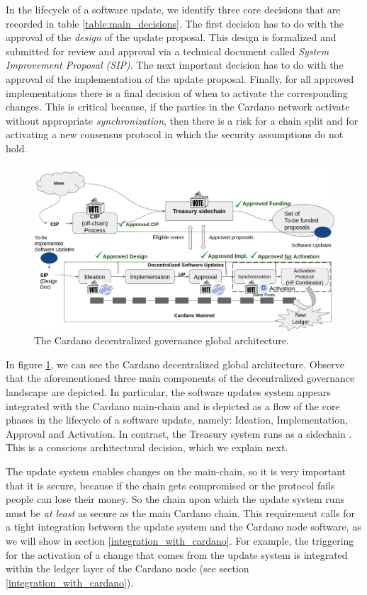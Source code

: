 In the lifecycle of a software update, we identify three core decisions that 
are 
recorded in table \ref{table:main_decisions}. The first decision has to do with 
the approval of the \emph{design} of the update proposal. This design is 
formalized and submitted for review and approval via a technical document 
called \emph{System Improvement Proposal (SIP)}. The next important decision 
has to do with the approval of the implementation of the update proposal. 
Finally, for all approved implementations there is a final decision of when to 
activate the corresponding changes. This is critical because, if the parties in 
the Cardano network activate without appropriate \emph{synchronization}, then 
there is a risk for a chain split and for activating a new consensus protocol 
in which the security assumptions do not hold.

\begin{figure}[h!] %
	\centering
	\includegraphics[width=0.8\columnwidth,
	keepaspectratio]{figures/cardano_dec_gov_landscape.png}
	\caption{The Cardano decentralized governance global architecture.}
	\label{fig:cardano_global_architecture}
\end{figure}

In figure \ref{fig:cardano_global_architecture}, we can see the Cardano 
decentralized global architecture. Observe that the aforementioned three main 
components of the decentralized governance landscape are depicted. In 
particular, the software updates system appears integrated with the Cardano 
main-chain and is depicted as a flow of the core phases in the lifecycle of a 
software update, namely: Ideation, Implementation, Approval and Activation. In 
contrast, the Treasury system runs as a sidechain \cite{sidechain}. This is a 
conscious architectural decision, which we explain next.

The update system enables changes on the main-chain, so it is very important 
that it is secure, because if the chain gets compromised or the protocol fails 
people can lose their money. So the chain upon which the update system runs 
must be \emph{at least} as secure as the main Cardano chain. This requirement 
calls for a tight integration between the update system and the Cardano node 
software, as we will show in section \ref{integration_with_cardano}. For 
example, 
the triggering for the activation of a change that comes from the update system 
is integrated within the ledger layer of the Cardano node (see section 
\ref{integration_with_cardano}). 

